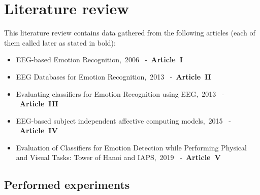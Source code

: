 \documentclass[10pt,journal,compsoc]{IEEEtran}
\begin{document}




\section{Literature review}
This literature review contains data gathered from the following articles (each of them called later as stated in bold):
\begin{itemize}
\item{EEG-based Emotion Recognition,~2006~\cite{art1} -~\mbox{\textbf{Article~I}}}
\item{EEG Databases for Emotion Recognition,~2013~\cite{art2} -~\mbox{\textbf{Article~II}}}
\item{Evaluating classifiers for Emotion Recognition using EEG,~2013~\cite{art3} -~\mbox{\textbf{Article~III}}}
\item{EEG-based subject independent affective computing models,~2015~\cite{art4} -~\mbox{\textbf{Article~IV}}}
\item{Evaluation of Classifiers for Emotion Detection while Performing Physical and Visual Tasks: Tower of Hanoi and IAPS,~2019~\cite{art5} -~\mbox{\textbf{Article~V}}}
\end{itemize}

\subsection{Performed experiments}
\end{document}

